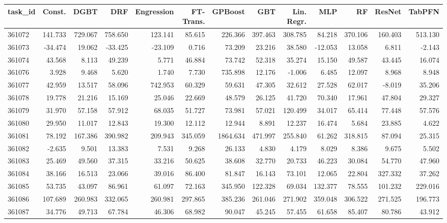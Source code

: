 \begin{tabular}{lrrrrrrrrrrrr}
\toprule
task\_id & Const. & DGBT & DRF & Engression & FT-Trans. & GPBoost & GBT & Lin. Regr. & MLP & RF & ResNet & TabPFN \\
\midrule
361072 & 141.733 & 729.067 & 758.650 & 123.141 & 85.615 & 226.366 & 397.463 & 308.785 & 84.218 & 370.106 & 160.403 & 513.130 \\
361073 & -34.474 & 19.062 & -33.425 & -23.109 & 0.716 & 73.209 & 23.216 & 38.580 & -12.053 & 13.058 & 6.811 & -2.143 \\
361074 & 43.568 & 8.113 & 49.239 & 5.771 & 46.884 & 73.742 & 52.318 & 35.274 & 15.150 & 49.587 & 43.445 & 16.074 \\
361076 & 3.928 & 9.468 & 5.620 & 1.740 & 7.730 & 735.898 & 12.176 & -1.006 & 6.485 & 12.097 & 8.968 & 8.948 \\
361077 & 42.959 & 13.517 & 58.096 & 742.953 & 60.329 & 59.631 & 47.305 & 32.612 & 27.528 & 62.017 & -8.019 & 35.206 \\
361078 & 19.778 & 21.216 & 15.169 & 25.046 & 22.669 & 48.579 & 26.125 & 41.720 & 70.340 & 17.961 & 47.804 & 29.327 \\
361079 & 31.970 & 57.158 & 57.912 & 68.035 & 51.727 & 73.981 & 57.021 & 120.499 & 34.017 & 65.414 & 77.448 & 57.576 \\
361080 & 29.950 & 11.017 & 12.843 & 19.300 & 12.112 & 12.944 & 8.891 & 12.237 & 16.474 & 5.684 & 23.885 & 4.622 \\
361081 & 78.192 & 167.386 & 390.982 & 209.943 & 345.059 & 1864.634 & 471.997 & 255.840 & 61.262 & 318.815 & 87.094 & 25.315 \\
361082 & -2.635 & 9.501 & 13.383 & 7.531 & 9.268 & 26.133 & 4.830 & 4.179 & 8.029 & 8.386 & 9.675 & 5.502 \\
361083 & 25.469 & 49.560 & 37.315 & 33.216 & 50.625 & 38.608 & 32.770 & 20.733 & 46.223 & 30.084 & 54.770 & 47.960 \\
361084 & 38.166 & 16.513 & 23.066 & 39.016 & 86.400 & 81.847 & 16.143 & 73.101 & 12.065 & 22.804 & 327.332 & 37.262 \\
361085 & 53.735 & 43.097 & 86.961 & 61.097 & 72.163 & 345.950 & 122.328 & 69.034 & 132.377 & 78.555 & 101.232 & 229.016 \\
361086 & 107.689 & 260.983 & 332.065 & 260.981 & 297.865 & 385.236 & 261.046 & 271.902 & 359.048 & 306.522 & 271.525 & 196.773 \\
361087 & 34.776 & 49.713 & 67.784 & 46.306 & 68.982 & 90.047 & 45.245 & 57.455 & 61.658 & 85.407 & 80.786 & 43.912 \\

\end{tabular}
